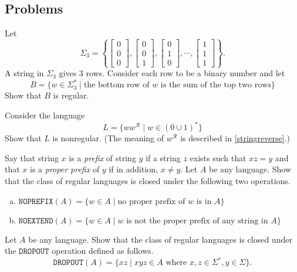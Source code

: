 \subsection*{Problems}

\begin{exercise}
Let
$$\Sigma_3=\left\{\begin{bmatrix}0\\0\\0\end{bmatrix}, \begin{bmatrix}0\\0\\1\end{bmatrix}, \begin{bmatrix}0\\1\\0\end{bmatrix},\cdots,\begin{bmatrix}1\\1\\1\end{bmatrix}\right\}.$$
A string in $\Sigma_3$ gives $3$ rows. Consider each row to be a binary number and let
$$B=\{w\in\Sigma_3^*\mid \text{the bottom row of $w$ is the sum of the top two rows}\}$$
Show that $B$ is regular.
\end{exercise}

\begin{exercise}
\label{LwwR}
Consider the language
$$L=\{ww^\mathcal{R}\mid w\in (0\cup 1)^*\}$$
Show that $L$ is nonregular. (The meaning of $w^\mathcal{R}$ is described in \ref{stringreverse}.)
\end{exercise}

\begin{exercise}
Say that string $x$ is a \textit{prefix} of string $y$ if a string $z$ exists such that $xz=y$ and that $x$ is a \textit{proper prefix} of $y$ if in addition, $x\neq y$. Let $A$ be any language. Show that the class of regular languages is closed under the following two operations.
\begin{enumerate}[(a)]
    \item $\texttt{NOPREFIX}(A)=\{w\in A\mid \text{no proper prefix of $w$ is in $A$}\}$
    \item $\texttt{NOEXTEND}(A)=\{w\in A\mid w\text{ is not the proper prefix of any string in $A$}\}$
\end{enumerate}
\end{exercise}

\begin{exercise}
Let $A$ be any language. Show that the class of regular languages is closed under the $\texttt{DROPOUT}$ operation defined as follows.
$$\texttt{DROPOUT}(A)=\{xz\mid xyz\in A\text{ where }x,z\in\Sigma^*,y\in\Sigma\}.$$
\end{exercise}

